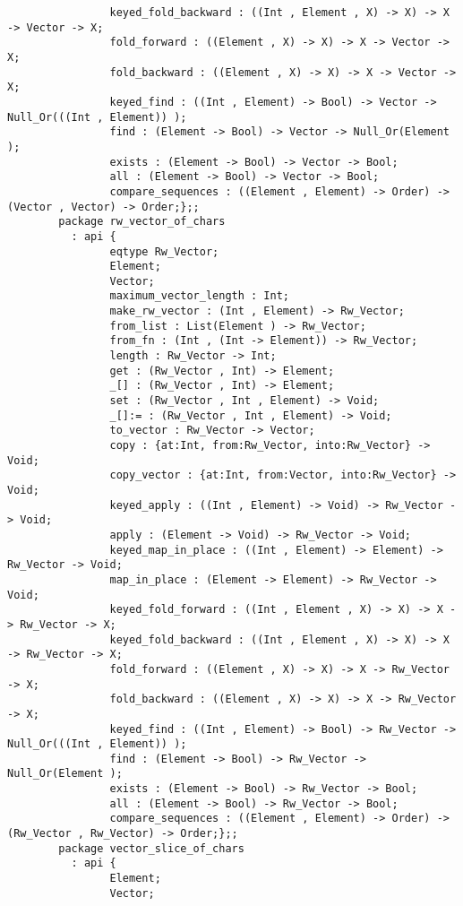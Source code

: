 \begin{verbatim}
                keyed_fold_backward : ((Int , Element , X) -> X) -> X -> Vector -> X;
                fold_forward : ((Element , X) -> X) -> X -> Vector -> X;
                fold_backward : ((Element , X) -> X) -> X -> Vector -> X;
                keyed_find : ((Int , Element) -> Bool) -> Vector -> Null_Or(((Int , Element)) );
                find : (Element -> Bool) -> Vector -> Null_Or(Element );
                exists : (Element -> Bool) -> Vector -> Bool;
                all : (Element -> Bool) -> Vector -> Bool;
                compare_sequences : ((Element , Element) -> Order) -> (Vector , Vector) -> Order;};;
        package rw_vector_of_chars
          : api {
                eqtype Rw_Vector;
                Element;
                Vector;
                maximum_vector_length : Int;
                make_rw_vector : (Int , Element) -> Rw_Vector;
                from_list : List(Element ) -> Rw_Vector;
                from_fn : (Int , (Int -> Element)) -> Rw_Vector;
                length : Rw_Vector -> Int;
                get : (Rw_Vector , Int) -> Element;
                _[] : (Rw_Vector , Int) -> Element;
                set : (Rw_Vector , Int , Element) -> Void;
                _[]:= : (Rw_Vector , Int , Element) -> Void;
                to_vector : Rw_Vector -> Vector;
                copy : {at:Int, from:Rw_Vector, into:Rw_Vector} -> Void;
                copy_vector : {at:Int, from:Vector, into:Rw_Vector} -> Void;
                keyed_apply : ((Int , Element) -> Void) -> Rw_Vector -> Void;
                apply : (Element -> Void) -> Rw_Vector -> Void;
                keyed_map_in_place : ((Int , Element) -> Element) -> Rw_Vector -> Void;
                map_in_place : (Element -> Element) -> Rw_Vector -> Void;
                keyed_fold_forward : ((Int , Element , X) -> X) -> X -> Rw_Vector -> X;
                keyed_fold_backward : ((Int , Element , X) -> X) -> X -> Rw_Vector -> X;
                fold_forward : ((Element , X) -> X) -> X -> Rw_Vector -> X;
                fold_backward : ((Element , X) -> X) -> X -> Rw_Vector -> X;
                keyed_find : ((Int , Element) -> Bool) -> Rw_Vector -> Null_Or(((Int , Element)) );
                find : (Element -> Bool) -> Rw_Vector -> Null_Or(Element );
                exists : (Element -> Bool) -> Rw_Vector -> Bool;
                all : (Element -> Bool) -> Rw_Vector -> Bool;
                compare_sequences : ((Element , Element) -> Order) -> (Rw_Vector , Rw_Vector) -> Order;};;
        package vector_slice_of_chars
          : api {
                Element;
                Vector;

\end{verbatim}
